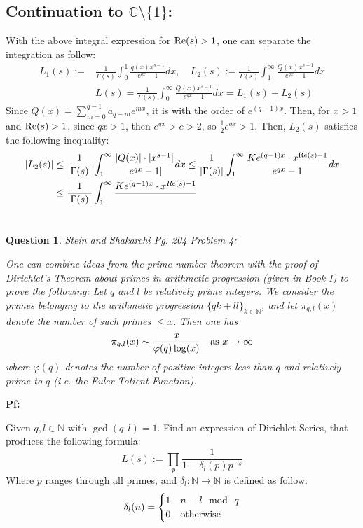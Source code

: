 \documentclass{article}
\newtheorem{question}{Question}
\begin{document}
\subsection{Continuation to $\mathbb{C}\setminus\{1\}$:}
With the above integral expression for $\textmd{Re}(s)>1$, one can separate the integration as follow:
\begin{equation}
    \label{eq:6}
    \begin{split}
        L_1(s):=&\frac{1}{\Gamma(s)}\int_{0}^{1}\frac{q(x)x^{s-1}}{e^{qx}-1}dx,\quad L_2(s):=\frac{1}{\Gamma(s)}\int_{1}^{\infty}\frac{Q(x)x^{s-1}}{e^{qx}-1}dx\\
        &L(s) = \frac{1}{\Gamma(s)}\int_{0}^{\infty}\frac{Q(x)x^{s-1}}{e^{qx}-1}dx = L_1(s)+L_2(s)
    \end{split}
\end{equation}
Since $Q(x)=\sum_{m=0}^{q-1}a_{q-m}e^{mx}$, it is with the order of $e^{(q-1)x}$. Then, for $x>1$ and $\textmd{Re}(s)>1$, since $qx >1$, then $e^{qx}>e>2$, so $\frac{1}{2}e^{qx}>1$. Then, $L_2(s)$ satisfies the following inequality:
\begin{equation}
    \label{eq:7}
    \begin{split}
        |L_2(s)|&\leq \frac{1}{|\Gamma(s)|}\int_{1}^{\infty}\frac{|Q(x)|\cdot|x^{s-1}|}{|e^{qx}-1|}dx \leq \frac{1}{|\Gamma(s)|}\int_{1}^{\infty}\frac{Ke^{(q-1)x}\cdot x^{\textmd{Re}(s)-1}}{e^{qx}-1}dx\\
        &\leq \frac{1}{|\Gamma(s)|}\int_{1}^{\infty}\frac{Ke^{(q-1)x}\cdot x^{Re(s)-1}}{}
    \end{split}
\end{equation}

\break

\section{}
\begin{question}\label{q:2}
    Stein and Shakarchi Pg. 204 Problem 4:

    One can combine ideas from the prime number theorem with the proof of Dirichlet's Theorem about primes in arithmetic progression (given in Book I) to prove the following: Let $q$ and $l$ be relatively prime integers. We consider the primes belonging to the arithmetic progression $\{qk+ll\}_{k\in\mathbb{N}}$, and let $\pi_{q,l}(x)$ denote the number of such primes $\leq x$. Then one has 
    $$\pi_{q,l}(x)\sim \frac{x}{\varphi(q)\log(x)}\quad \textmd{as }x\rightarrow\infty$$
    where $\varphi(q)$ denotes the number of positive integers less than $q$ and relatively prime to $q$ (i.e. the Euler Totient Function).
\end{question}

\textbf{Pf:}

Given $q,l\in\mathbb{N}$ with $\gcd(q,l)=1$. Find an expression of Dirichlet Series, that produces the following formula:
$$L(s):=\prod_{p}\frac{1}{1-\delta_l(p)p^{-s}}$$
Where $p$ ranges through all primes, and $\delta_l:\mathbb{N}\rightarrow\mathbb{N}$ is defined as follow:
$$\delta_l(n)=\begin{cases}
    1 & n\equiv l\mod\ q\\
    0 & \textmd{otherwise}
\end{cases}$$
\end{document}
